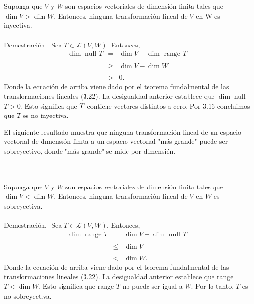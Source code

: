 \begin{myteo}\,\\\\
    Suponga que $V$ y $W$ son espacios vectoriales de dimensión finita tales que $\dim V>\dim W$. Entonces, ninguna transformación lineal de $V$ en W es inyectiva.\\\\
	Demostración.-\; Sea $T\in \mathcal{L}(V,W)$. Entonces,
	$$
	\begin{array}{rcl}
	    \dim \mbox{ null } T &=& \dim V - \dim \mbox{ range } T\\\\
				 &\geq & \dim V - \dim W\\\\
				 &>& 0.
	\end{array}
	$$
	Donde la ecuación de arriba viene dado por el teorema fundalmental de las transformaciones lineales (3.22). La desigualdad anterior establece que $\dim$ null $T > 0$. Esto significa que $\null T$ contiene vectores distintos a cero. Por 3.16 concluimos que $T$ es no inyectiva.
\end{myteo}

El siguiente resultado muestra que ninguna transformación lineal de un espacio vectorial de dimensión finita a un espacio vectorial "más grande" puede ser sobreyectivo, donde "más grande" se mide por dimensión.

\begin{myteo}\,\\\\
    Suponga que $V$ y $W$ son espacios vectoriales de dimensión finita tales que $\dim V<\dim W$. Entonces, ninguna transformación lineal de $V$ en $W$ es sobreyectiva.\\\\
	Demostración.-\; Sea $T\in \mathcal{L}(V,W)$. Entonces,
	$$
	\begin{array}{rcl}
	    \dim \mbox{ range } T &=& \dim V - \dim \mbox{ null } T\\\\
				  &\leq & \dim V\\\\
				  &<& \dim W.
	\end{array}
	$$
	Donde la ecuación de arriba viene dado por el teorema fundalmental de las transformaciones lineales (3.22). La desigualdad anterior establece que range $T < \dim W$. Esto significa que range $T$ no puede ser igual a $W$.  Por lo tanto, $T$ es no sobreyectiva.\\\\
\end{myteo}


